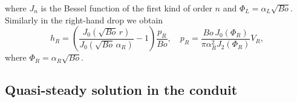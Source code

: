 \documentclass{jfm}
\newcommand{\besselj}[2]{J_{#1}\!\left(#2\right)}
\begin{document}
where $ J_n$  is the Bessel function of the first kind of order $n$ and 
  $\Phi_L = \alpha_L\sqrt{Bo}  $.
Similarly in the right-hand drop we obtain
\label{eqn: drop height right}%
\begin{equation}
 h_R=\left(  \frac{     \besselj{0}{\sqrt{Bo}\, r}}{ \besselj{0}{\sqrt{Bo} \,\alpha_R}} -1  \right) \frac{p_R}{Bo}, \quad   p_R = \frac{Bo  \, \besselj{0}{\Phi_R }}{\pi \alpha_R^2 \besselj{2}{\Phi_R}}V_R, \tag{\theequation a,b}  
  \end{equation}
  where $\Phi_R =\alpha_R \sqrt{Bo}  $.
 
 
 
\subsection{Quasi-steady solution in the conduit}


\end{document}
